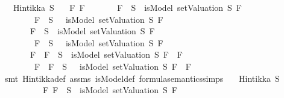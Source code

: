 \begin{isabellebody}
\ \ \ {\isachardoublequoteopen}Hintikka\ S{\isachardoublequoteclose}\isanewline
\ \ \ {\isachardoublequoteopen}{\isasymAnd}F{}\ F{}{\isachardot}\isanewline
\ \ \ \ \ \ \ {\isacharparenleft}F{}\ {\isasymin}\ S\ {\isasymlongrightarrow}\ isModel\ {\isacharparenleft}setValuation\ S{\isacharparenright}\ F{}{\isacharparenright}\ {\isasymand}\isanewline
\ \ \ \ \ \ \ {\isacharparenleft}\isactrlbold {\isasymnot}\ F{}\ {\isasymin}\ S\ {\isasymlongrightarrow}\ {\isasymnot}\ isModel\ {\isacharparenleft}setValuation\ S{\isacharparenright}\ F{}{\isacharparenright}\ {\isasymLongrightarrow}\isanewline
\ \ \ \ \ \ \ {\isacharparenleft}F{}\ {\isasymin}\ S\ {\isasymlongrightarrow}\ isModel\ {\isacharparenleft}setValuation\ S{\isacharparenright}\ F{}{\isacharparenright}\ {\isasymand}\isanewline
\ \ \ \ \ \ \ {\isacharparenleft}\isactrlbold {\isasymnot}\ F{}\ {\isasymin}\ S\ {\isasymlongrightarrow}\ {\isasymnot}\ isModel\ {\isacharparenleft}setValuation\ S{\isacharparenright}\ F{}{\isacharparenright}\ {\isasymLongrightarrow}\isanewline
\ \ \ \ \ \ \ {\isacharparenleft}F{}\ \isactrlbold {\isasymor}\ F{}\ {\isasymin}\ S\ {\isasymlongrightarrow}\ isModel\ {\isacharparenleft}setValuation\ S{\isacharparenright}\ {\isacharparenleft}F{}\ \isactrlbold {\isasymor}\ F{}{\isacharparenright}{\isacharparenright}\ {\isasymand}\isanewline
\ \ \ \ \ \ \ {\isacharparenleft}\isactrlbold {\isasymnot}\ {\isacharparenleft}F{}\ \isactrlbold {\isasymor}\ F{}{\isacharparenright}\ {\isasymin}\ S\ {\isasymlongrightarrow}\ {\isasymnot}\ isModel\ {\isacharparenleft}setValuation\ S{\isacharparenright}\ {\isacharparenleft}F{}\ \isactrlbold {\isasymor}\ F{}{\isacharparenright}{\isacharparenright}{\isachardoublequoteclose}\isanewline
%
\isadelimproof
\ \ %
\endisadelimproof
%
\isatagproof
{}\isamarkupfalse%
\ {\isacharparenleft}smt\ Hintikka{\isacharunderscore}def\ assms\ isModel{\isacharunderscore}def\ formula{\isacharunderscore}semantics{\isachardot}simps{\isacharparenleft}{}{\isacharparenright}{\isacharparenright}%
\endisatagproof
{\isafoldproof}%
%
\isadelimproof
\isanewline
%
\endisadelimproof
\isanewline
{}\isamarkupfalse%
\isanewline
\ \ \ {\isachardoublequoteopen}Hintikka\ S{\isachardoublequoteclose}\isanewline
\ \ \ \ \ \ \ \ \ \ {\isachardoublequoteopen}{\isasymAnd}F{}{\isachardot}\ {\isacharparenleft}F{}\ {\isasymin}\ S\ {\isasymlongrightarrow}\ isModel\ {\isacharparenleft}setValuation\ S{\isacharparenright}\ F{}{\isacharparenright}\ {\isasymand}\isanewline

\end{isabellebody}
